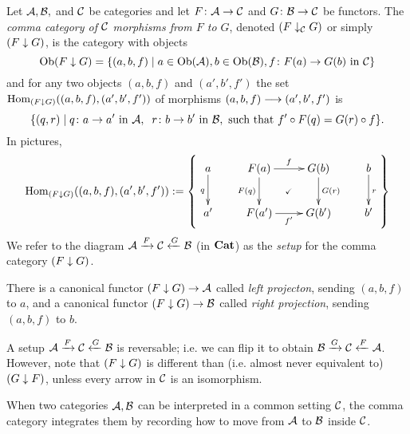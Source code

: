 \begin{definition}\label{def:comma category}

Let $\mathcal{A},\mathcal{B},$ and $\mathcal{C}$ be categories and let $F\colon\mathcal{A}\rightarrow\mathcal{C}$ and $G\colon\mathcal{B}\rightarrow\mathcal{C}$ be functors. The {\em comma category of $\mathcal{C}$ morphisms from $F$ to $G$}, denoted $(F\downarrow_\mathcal{C} G)$ or simply $(F\downarrow G)$, is the category with objects $$\textnormal{Ob}(F\downarrow G)=\{(a,b,f){\;|\;}a\in\textnormal{Ob}(\mathcal{A}), b\in\textnormal{Ob}(\mathcal{B}), f\colon F(a)\rightarrow G(b)\textnormal{ in }\mathcal{C}\}$$ and for any two objects $(a,b,f)$ and $(a',b',f')$ the set $\textnormal{Hom}_{(F\downarrow G)}((a,b,f),(a',b',f'))$ of morphisms $(a,b,f)\longrightarrow(a',b',f')$ is 
$$\{(q,r){\;|\;}q\colon a\rightarrow a'\textnormal{ in }\mathcal{A},\;\; r\colon b\rightarrow b'\textnormal{ in }\mathcal{B},\textnormal{ such that } f'\circ F(q)=G(r)\circ f\}.$$
In pictures,
$$\Hom_{(F\down G)}((a,b,f),(a',b',f')):=\left\{\parbox{2in}{\xymatrix{
a\ar[d]_q&F(a)\ar@{}[dr]|{\checkmark}\ar[r]^f\ar[d]_{F(q)}&G(b)\ar[d]^{G(r)}&b\ar[d]^r\\
a'&F(a')\ar[r]_{f'}&G(b')&b'
}}\right\}$$
We refer to the diagram $\mathcal{A}\xrightarrow{F}\mathcal{C}\xleftarrow{G}\mathcal{B}$ (in ${\bf Cat}$) as the {\em setup} for the comma category $(F\downarrow G)$.

There is a canonical functor $(F\downarrow G)\rightarrow\mathcal{A}$ called {\em left projecton}, sending $(a,b,f)$ to $a$, and a canonical functor $(F\downarrow G)\rightarrow\mathcal{B}$ called {\em right projection}, sending $(a,b,f)$ to $b$. 

\end{definition}

A setup $\mathcal{A}\xrightarrow{F}\mathcal{C}\xleftarrow{G}\mathcal{B}$ is reversable; i.e. we can flip it to obtain $\mathcal{B}\xrightarrow{G}\mathcal{C}\xleftarrow{F}\mathcal{A}$. However, note that $(F\downarrow G)$ is different than (i.e. almost never equivalent to) $(G\downarrow F)$, unless every arrow in $\mathcal{C}$ is an isomorphism.

\begin{slogan}
When two categories $\mathcal{A},\mathcal{B}$ can be interpreted in a common setting $\mathcal{C}$, the comma category integrates them by recording how to move from $\mathcal{A}$ to $\mathcal{B}$ inside $\mathcal{C}$.
\end{slogan}

